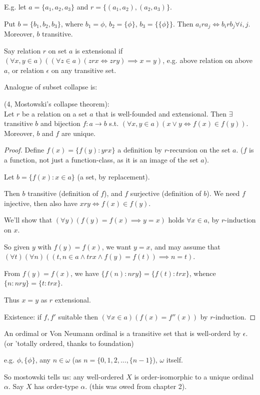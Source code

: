 \documentclass[a4paper]{article}
\begin{document}
E.g. let $a = \{a_1,a_2,a_3\}$ and $r=\{(a_1,a_2),(a_2,a_3)\}$.

Put $b = \{b_1,b_2,b_3\}$, where $b_1 = \phi$, $b_2 = \{\phi\}$, $b_3 = \{\{\phi\}\}$. Then $a_i r a_j \iff b_i r b_j \forall i,j$. Moreover, $b$ transitive.

Say relation $r$ on set $a$ is extensional if $(\forall x,y \in a) ((\forall z \in a)(zrx \iff zry) \implies x=y)$, e.g. above relation on above $a$, or relation $\epsilon$ on any transitive set.

Analogue of subset collapse is:

\begin{thm} (4, Mostowski's collapse theorem):\\
Let $r$ be a relation on a set $a$ that is well-founded and extensional. Then $\exists$ transitive $b$ and bijection $f:a \to b$ s.t. $(\forall x,y \in a)(x \vee y \iff f(x) \in f(y))$. Moreover, $b$ and $f$ are unique.
\begin{proof}
Define $f(x)=\{f(y):yrx\}$ a definition by $r$-recursion on the set $a$. ($f$ is a function, not just a function-class, as it is an image of the set $a$).

Let $b = \{f(x):x \in a\}$ (a set, by replacement).

Then $b$ transitive (definition of $f$), and $f$ surjective (definition of $b$). We need $f$ injective, then also have $xry \iff f(x) \in f(y)$.

We'll show that $(\forall y) (f(y) = f(x) \implies y=x)$ holds $\forall x \in a$, by $r$-induction on $x$.

So given $y$ with $f(y) =f(x)$, we want $y=x$, and may assume that $(\forall t)(\forall n) ((t,n \in a \wedge trx \wedge f(y)=f(t) ) \implies n=t)$.

From $f(y)=f(x)$, we have $\{f(n):nry\} = \{f(t):trx\}$, whence $\{n:nry\} = \{t:trx\}$.

Thus $x=y$ as $r$ extensional.

Existence: if $f,f'$ suitable then $(\forall x \in a) (f(x) = f''(x))$ by $r$-induction.
\end{proof}
\end{thm}

An ordimal or Von Neumann ordinal is a transitive set that is well-orderd by $\epsilon$. (or 'totally ordered, thanks to foundation)

e.g. $\phi,\{\phi\}$, any $n \in \omega$ (as $n=\{0,1,2,...,\{n-1\}$), $\omega$ itself.

So mostowski tells us: any well-ordered $X$ is order-isomorphic to a unique ordinal $\alpha$. Say $X$ has order-type $\alpha$. (this was owed from chapter 2).
\end{document}
